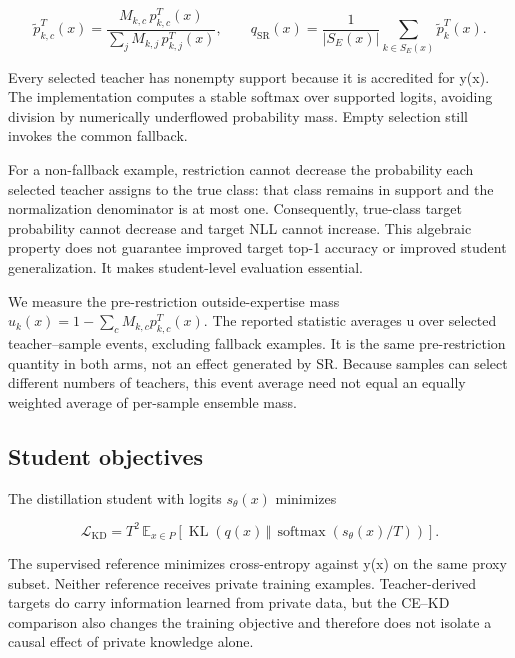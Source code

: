 \[
\widetilde p^T_{k,c}(x)=
\frac{M_{k,c}\,p^T_{k,c}(x)}{\sum_j M_{k,j}\,p^T_{k,j}(x)},
\qquad
q_{\mathrm{SR}}(x)=\frac{1}{|S_E(x)|}\sum_{k\in S_E(x)}\widetilde p_k^T(x).
\]

Every selected teacher has nonempty support because it is accredited for y(x). The implementation computes a stable softmax over supported logits, avoiding division by numerically underflowed probability mass. Empty selection still invokes the common fallback.

For a non-fallback example, restriction cannot decrease the probability each selected teacher assigns to the true class: that class remains in support and the normalization denominator is at most one. Consequently, true-class target probability cannot decrease and target NLL cannot increase. This algebraic property does not guarantee improved target top-1 accuracy or improved student generalization. It makes student-level evaluation essential.

We measure the pre-restriction outside-expertise mass \(u_k(x)=1-\sum_c M_{k,c}p^T_{k,c}(x).\) The reported statistic averages u over selected teacher--sample events, excluding fallback examples. It is the same pre-restriction quantity in both arms, not an effect generated by SR. Because samples can select different numbers of teachers, this event average need not equal an equally weighted average of per-sample ensemble mass.

\hypertarget{student-objectives}{%
\subsection{Student objectives}\label{student-objectives}}

The distillation student with logits \(s_\theta(x)\) minimizes

\[
\mathcal L_{\mathrm{KD}}=T^2\,\mathbb E_{x\in P}\left[
\operatorname{KL}\left(q(x)\,\Vert\,\operatorname{softmax}(s_\theta(x)/T)\right)\right].
\]

The supervised reference minimizes cross-entropy against y(x) on the same proxy subset. Neither reference receives private training examples. Teacher-derived targets do carry information learned from private data, but the CE--KD comparison also changes the training objective and therefore does not isolate a causal effect of private knowledge alone.
